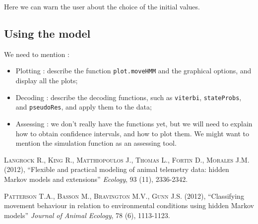 \documentclass[]{article}
\begin{document}
Here we can warn the user about the choice of the initial values.

\subsection{Using the model}
We need to mention :
\begin{itemize}
	\item Plotting : describe the function \texttt{plot.moveHMM} and the graphical options, and display all the plots;
	\item Decoding : describe the decoding functions, such as \texttt{viterbi}, \texttt{stateProbs}, and \texttt{pseudoRes}, and apply them to the data;
	\item Assessing : we don't really have the functions yet, but we will need to explain how to obtain confidence intervals, and how to plot them. We might want to mention the simulation function as an assessing tool.
\end{itemize}


\begin{thebibliography}{}

\textsc{Langrock R., King R., Matthiopoulos J., Thomas L., Fortin D., Morales J.M.} (2012),
``Flexible and practical modeling of animal telemetry data: hidden Markov models and extensions''
\textit{Ecology}, 93 (11), 2336-2342.

\textsc{Patterson T.A., Basson M., Bravington M.V., Gunn J.S.} (2012),
``Classifying movement behaviour in relation to environmental conditions using hidden Markov models''
\textit{Journal of Animal Ecology}, 78 (6), 1113-1123.

\end{thebibliography}
\end{document}
